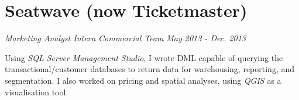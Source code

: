 \documentclass[letterpaper,11pt]{article}
\begin{document}
\section{Seatwave (now Ticketmaster)}
\textit{Marketing Analyst Intern}
\hfill
\textit{Commercial Team}
\hfill
\textit{May 2013 - Dec. 2013\\}


\noindent
Using \textit{SQL Server Management Studio}, I wrote DML capable of querying the transactional/customer databases to return data for warehousing, reporting, and segmentation. I also worked on pricing and spatial analyses, using \textit{QGIS} as a visualisation tool.

\end{document}
